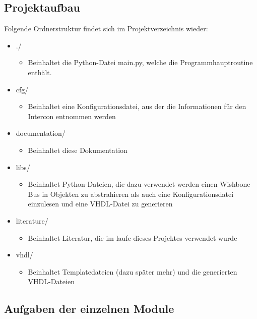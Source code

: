 \documentclass{article}
\begin{document}
\subsection{Projektaufbau}
Folgende Ordnerstruktur findet sich im Projektverzeichnis wieder:
\begin{itemize}
\item ./
\begin{itemize}
\item Beinhaltet die Python-Datei main.py, welche die Programmhauptroutine enthält.
\end{itemize}
\item cfg/
\begin{itemize}
\item Beinhaltet eine Konfigurationsdatei, aus der die Informationen für den Intercon entnommen werden
\end{itemize}
\item documentation/
\begin{itemize}
\item Beinhaltet diese Dokumentation
\end{itemize}
\item libs/
\begin{itemize}
\item Beinhaltet Python-Dateien, die dazu verwendet werden einen Wishbone Bus in Objekten zu abstrahieren als auch eine Konfigurationsdatei einzulesen und eine VHDL-Datei zu generieren
\end{itemize}
\item literature/
\begin{itemize}
\item Beinhaltet Literatur, die im laufe dieses Projektes verwendet wurde
\end{itemize}
\item vhdl/
\begin{itemize}
\item Beinhaltet Templatedateien (dazu später mehr) und die generierten VHDL-Dateien
\end{itemize}
\end{itemize}
\subsection{Aufgaben der einzelnen Module}
\end{document}
